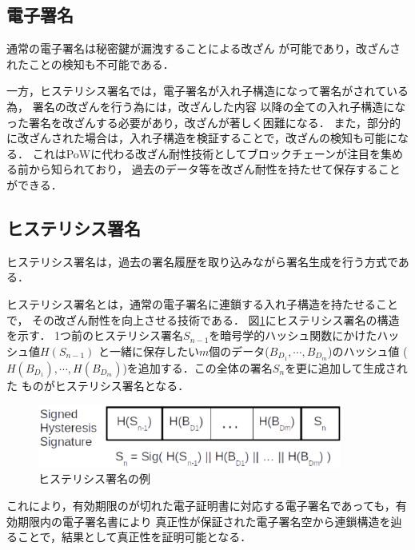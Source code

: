 \documentclass[a4paper,12pt]{jsarticle}
\begin{document}
      \subsection*{電子署名}
通常の電子署名は秘密鍵が漏洩することによる改ざん
が可能であり，改ざんされたことの検知も不可能である．

一方，ヒステリシス署名では，電子署名が入れ子構造になって署名がされている為，
署名の改ざんを行う為には，改ざんした内容
以降の全ての入れ子構造になった署名を改ざんする必要があり，改ざんが著しく困難になる．
また，部分的に改ざんされた場合は，入れ子構造を検証することで，改ざんの検知も可能になる．
これはPoWに代わる改ざん耐性技術としてブロックチェーンが注目を集める前から知られており，
過去のデータ等を改ざん耐性を持たせて保存することができる．

      \subsection{ヒステリシス署名}

ヒステリシス署名は，過去の署名履歴を取り込みながら署名生成を行う方式である．

ヒステリシス署名\cite{suzaki}とは，通常の電子署名に連鎖する入れ子構造を持たせることで，
その改ざん耐性を向上させる技術である．
図\ref{fig:hysteresis}にヒステリシス署名の構造を示す．
1つ前のヒステリシス署名$S_{n-1}$を暗号学的ハッシュ関数にかけたハッシュ値$H(S_{n-1})$
と一緒に保存したい$m$個のデータ($B_{D_1}, \cdots, B_{D_m}$)のハッシュ値
($H(B_{D_1}), \cdots, H(B_{D_m})$)を追加する．この全体の署名$S_n$を更に追加して生成された
ものがヒステリシス署名となる．

\begin{figure}[H]%
  \begin{center}
    \includegraphics[width=100mm]{pht/hysteresis_signature.eps}
  \end{center}
  \caption{ヒステリシス署名の例}
  \label{fig:hysteresis}
\end{figure}


これにより，有効期限のが切れた電子証明書に対応する電子署名であっても，有効期限内の電子署名書により
真正性が保証された電子署名空から連鎖構造を辿ることで，結果として真正性を証明可能となる．
\end{document}
